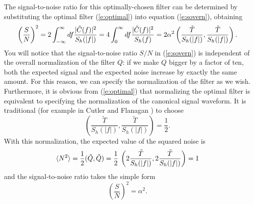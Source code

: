 The signal-to-noise ratio for this optimally-chosen filter can be
determined by substituting the optimal filter (\ref{e:optimal}) into
equation (\ref{e:sovern}), obtaining
\begin{equation}
\nonumber
\left( {S \over N} \right)^2 = 
 2 \int_{-\infty}^\infty df {| \tilde C(f) |^2 \over S_h(|f|)} =
 4 \int_{0}^\infty df { | \tilde C(f) |^2 \over S_h(f)} = 2 \alpha^2 
 \left(\frac{\tilde{T}}{S_h(|f|)},\frac{\tilde{T}}{S_h(|f|)}\right).
\end{equation}
You will notice that the signal-to-noise ratio $S/N$ in
(\ref{e:sovern}) is independent of the overall normalization of the
filter $Q$:  if we make $Q$ bigger by a factor of ten, both the
expected signal and the expected noise increase by exactly the same
amount.  For this reason, we can specify the normalization of the 
filter as we wish. Furthermore, it is obvious from (\ref{e:optimal}) 
that normalizing the optimal filter is equivalent to specifying the
normalization of the canonical signal waveform. It is traditional
(for example in Cutler and Flanagan \cite{cutler:1994})
to choose 
\begin{equation}
\label{e:cfnorm}
   \left(\frac{\tilde{T}}{S_h(|f|)},\frac{\tilde{T}}{S_h(|f|)}
   \right)=\frac{1}{2}.
\end{equation}
With this normalization, 
the expected value of the squared noise is
\begin{equation}
\langle N^2 \rangle = {1 \over 2} (\tilde Q,\tilde Q) = {1 \over 2} \>
\left( 2 \frac{\tilde{T}}{S_h(|f|)},2 \frac{\tilde{T}}{S_h(|f|)}
   \right) = 1
\end{equation}
and the signal-to-noise ratio takes the simple form
\begin{equation}
\left(\frac{S}{N}\right)^2 = \alpha^2.
\end{equation}

\newpage
\newpage
\newpage
\newpage
\newpage
\newpage
